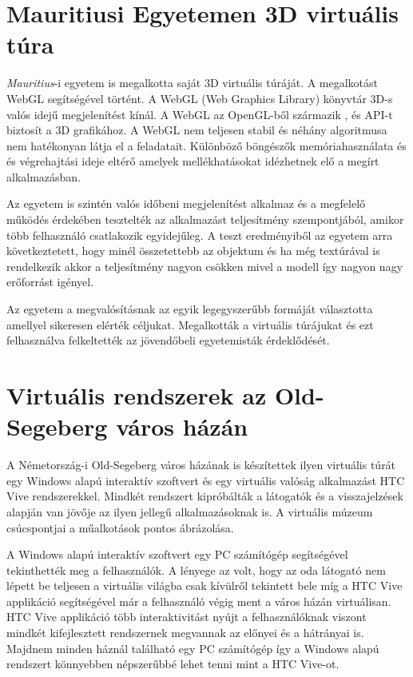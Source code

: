 \section{Mauritiusi Egyetemen 3D virtuális túra}
 
{\textit{Mauritius}\footnotemark}-i egyetem \cite{moloo20163d} is megalkotta saját 3D virtuális túráját. A megalkotást WebGL segítségével történt. A WebGL (Web Graphics Library) könyvtár 3D-s valós idejű megjelenítést kínál. A WebGL az OpenGL-ből származik , és API-t biztosít a 3D grafikához.  A WebGL nem teljesen stabil  és néhány algoritmusa nem hatékonyan látja el a feladatait. Különböző böngészők memóriahasználata és és végrehajtási ideje eltérő amelyek mellékhatásokat idézhetnek elő a megírt alkalmazásban.


Az egyetem is szintén valós időbeni megjelenítést alkalmaz és a megfelelő működés érdekében tesztelték az alkalmazást teljesítmény szempontjából, amikor több felhasználó csatlakozik egyidejűleg.  A teszt eredményiből az egyetem arra következtetett, hogy minél összetettebb az objektum és ha még textúrával is rendelkezik akkor a teljesítmény nagyon csökken mivel a modell így nagyon nagy erőforrást igényel. 

Az egyetem a megvalósításnak az egyik legegyszerűbb formáját választotta amellyel sikeresen elérték céljukat. Megalkották a virtuális túrájukat és ezt felhasználva felkeltették az jövendőbeli egyetemisták érdeklődését.

\section{Virtuális rendszerek az Old-Segeberg város házán}

A Németország-i Old-Segeberg \cite{kersten2017development} város házának is készítettek ilyen virtuális túrát egy Windows alapú interaktív szoftvert és egy virtuális valóság alkalmazást HTC Vive rendszerekkel. Mindkét rendszert kipróbálták a látogatók és a visszajelzések alapján van jövője az ilyen jellegű alkalmazásoknak is. A virtuális múzeum csúcspontjai a műalkotások pontos ábrázolása. 

A Windows alapú interaktív szoftvert egy PC számítógép segítségével tekinthették meg a felhasználók. A lényege az volt, hogy az oda látogató nem lépett be teljesen a virtuális világba csak kívülről tekintett bele míg a HTC Vive applikáció segítségével már a felhasználó végig ment a város házán virtuálisan. HTC Vive applikáció több interaktivitást nyújt a felhasználóknak viszont mindkét kifejlesztett rendszernek megvannak az előnyei és a hátrányai is. Majdnem minden háznál található egy PC számítógép így a Windows alapú rendszert könnyebben népszerűbbé lehet tenni mint a HTC Vive-ot.

